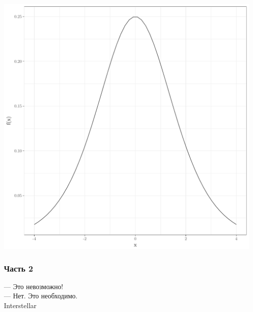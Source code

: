 \begin{enumerate}
\begin{minipage}{0.6\textwidth}
\begin{center}
\includegraphics[scale=0.5]{auto_figures_tikz/2014_2015_fig_01_dlogis.pdf}
\end{center}
\end{minipage}


\end{enumerate}


\subsubsection*{Часть 2}

\begin{flushright}
 — Это невозможно! \\
— Нет. Это необходимо.\\
\textcopyright \hspace{0.1cm} Interstellar
\end{flushright}

